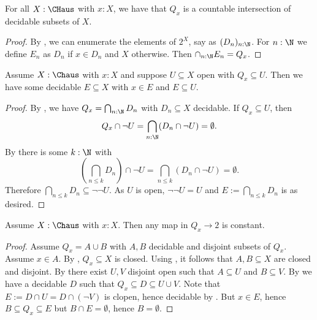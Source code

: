 \begin{lemma}\label{ConnectedComponentClosedInCompactHausdorff}
For all $X:\CHaus$ with $x:X$, we have that $Q_x$ is a countable intersection of decidable subsets of $X$.
\end{lemma}
\begin{proof}
  By ,
  we can enumerate the elements of $2^X$, say as $(D_n)_{n:\N}$. 
  For $n:\N$ we define $E_n$ as $D_n$ if $x\in D_n$ and $X$ otherwise. 
  Then $\cap_{n:\N}E_n = Q_x$.
\end{proof}

\begin{lemma}\label{ConnectedComponentSubOpenHasDecidableInbetween}
  Assume $X:\Chaus$ with $x:X$ and suppose $U\subseteq X$ open with $Q_x\subseteq U$. 
  Then we have some decidable $E\subseteq X$ with $x\in E$ and $E\subseteq U$. 
\end{lemma}
\begin{proof}
  By , 
  we have $Q_x = \bigcap_{n:\N}D_n$ with $D_n\subseteq X$ decidable. 
  If $Q_x \subseteq U$, then
  \[Q_x\cap \neg U = \bigcap_{n:\N} (D_n \cap \neg U) = \emptyset.\]
  By  there is some $k:\N$ with 
  \[(\bigcap_{n\leq k} D_n )\cap \neg U  = \bigcap_{n\leq k} (D_n \cap \neg U) = \emptyset.\]
  Therefore $\bigcap_{n\leq k} D_n \subseteq \neg\neg U$.
  As $U$ is open, $\neg \neg U = U$ and 
  $E:= \bigcap_{n\leq k} D_n$ is as desired. 
\end{proof}

\begin{lemma}\label{ConnectedComponentConnected}
Assume $X:\Chaus$ with $x:X$. Then any map in $Q_x\to 2$ is constant.
\end{lemma}
\begin{proof}
Assume $Q_x = A\cup B$ with $A,B$ decidable and disjoint subsets of $Q_x$. Assume $x\in A$. 
By , $Q_x\subseteq X$ is closed. 
Using , it follows that $A,B\subseteq X$ are closed and disjoint.
By  there exist $U,V$ disjoint open such that $A\subseteq U$ and $B\subseteq V$. 
By  we have a decidable $D$ such that $Q_x\subseteq D\subseteq U\cup V$. 
Note that $E := D\cap U = D \cap (\neg V)$ is clopen, hence decidable by .
But $x\in E$, hence $B\subseteq Q_x \subseteq E$ but $B \cap E = \emptyset$, hence $B=\emptyset$. 
\end{proof}

